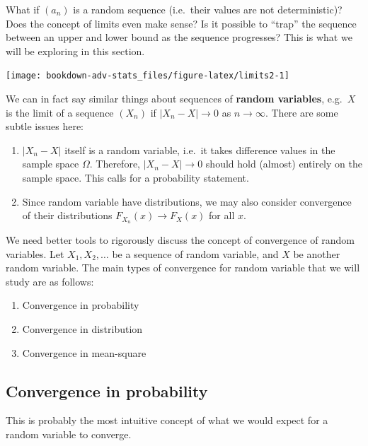 \documentclass[
]{book}
\providecommand{\tightlist}{%
  \setlength{\itemsep}{0pt}\setlength{\parskip}{0pt}}
\theoremstyle{definition}
\theoremstyle{definition}
\theoremstyle{definition}
\theoremstyle{definition}
\theoremstyle{remark}
\begin{document}
What if \((a_n)\) is a random sequence (i.e.~their values are not deterministic)?
Does the concept of limits even make sense?
Is it possible to ``trap'' the sequence between an upper and lower bound as the sequence progresses?
This is what we will be exploring in this section.

\begin{center}\texttt{[image: bookdown-adv-stats\_files/figure-latex/limits2-1]} \end{center}

We can in fact say similar things about sequences of \textbf{random variables}, e.g.~\(X\) is the limit of a sequence
\((X_n)\) if \(|X_n - X|\to 0\) as \(n\to\infty\).
There are some subtle issues here:

\begin{enumerate}
\def\labelenumi{\arabic{enumi}.}
\item
  \(|X_n-X|\) itself is a random variable, i.e.~it takes difference values in the
  sample space \(\Omega\). Therefore, \(|X_n - X|\to 0\) should hold
  (almost) entirely on the sample space. This calls for a probability
  statement.
\item
  Since random variable have distributions, we may also consider convergence of
  their distributions \(F_{X_n}(x)\to F_X(x)\) for all \(x\).
\end{enumerate}

We need better tools to rigorously discuss the concept of convergence of random variables.
Let \(X_1,X_2,\dots\) be a sequence of random variable, and \(X\)
be another random variable. The main types of convergence for random variable that we will study are as follows:

\begin{enumerate}
\def\labelenumi{\arabic{enumi}.}
\tightlist
\item
  Convergence in probability
\item
  Convergence in distribution
\item
  Convergence in mean-square
\end{enumerate}

\hypertarget{convergence-in-probability}{%
\subsection{Convergence in probability}\label{convergence-in-probability}}

This is probably the most intuitive concept of what we would expect for a random variable to converge.
\end{document}
